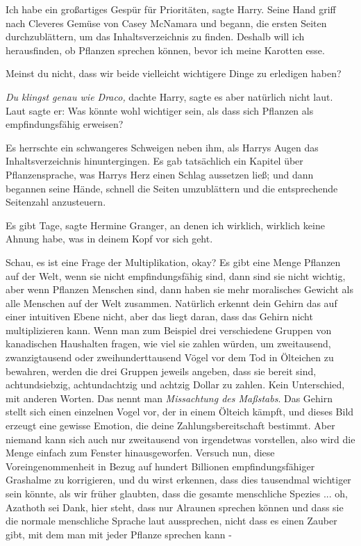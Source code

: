 \glqq{}Ich habe ein großartiges Gespür für Prioritäten\grqq{}, sagte Harry. Seine
Hand griff nach \glqq{}Cleveres Gemüse\grqq{} von Casey McNamara und begann, die
ersten Seiten durchzublättern, um das Inhaltsverzeichnis zu finden. \glqq{}
Deshalb will ich herausfinden, ob Pflanzen sprechen können, bevor ich meine
Karotten esse.\grqq{}

\glqq{}Meinst du nicht, dass wir beide vielleicht wichtigere Dinge zu erledigen
haben?\grqq{}

\emph{Du klingst genau wie Draco,} dachte Harry, sagte es aber natürlich nicht
laut. Laut sagte er: \glqq{}Was könnte wohl wichtiger sein, als dass sich
Pflanzen als empfindungsfähig erweisen?\grqq{}

Es herrschte ein schwangeres Schweigen neben ihm, als Harrys Augen das
Inhaltsverzeichnis hinuntergingen. Es gab tatsächlich ein Kapitel über
Pflanzensprache, was Harrys Herz einen Schlag aussetzen ließ; und dann begannen
seine Hände, schnell die Seiten umzublättern und die entsprechende Seitenzahl
anzusteuern.

\glqq{}Es gibt Tage\grqq{}, sagte Hermine Granger, \glqq{}an denen ich wirklich,
wirklich keine Ahnung habe, was in deinem Kopf vor sich geht.\grqq{}

\glqq{}Schau, es ist eine Frage der Multiplikation, okay? Es gibt eine Menge
Pflanzen auf der Welt, wenn sie nicht empfindungsfähig sind, dann sind sie nicht
wichtig, aber wenn Pflanzen Menschen sind, dann haben sie mehr moralisches
Gewicht als alle Menschen auf der Welt zusammen. Natürlich erkennt dein Gehirn
das auf einer intuitiven Ebene nicht, aber das liegt daran, dass das Gehirn
nicht multiplizieren kann. Wenn man zum Beispiel drei verschiedene Gruppen von
kanadischen Haushalten fragen, wie viel sie zahlen würden, um zweitausend,
zwanzigtausend oder zweihunderttausend Vögel vor dem Tod in Ölteichen zu
bewahren, werden die drei Gruppen jeweils angeben, dass sie bereit sind,
achtundsiebzig, achtundachtzig und achtzig Dollar zu zahlen. Kein Unterschied,
mit anderen Worten. Das nennt man \glqq{}\emph{Missachtung des Maßstabs}\grqq{}.
Das Gehirn stellt sich einen einzelnen Vogel vor, der in einem Ölteich kämpft,
und dieses Bild erzeugt eine gewisse Emotion, die deine Zahlungsbereitschaft
bestimmt. Aber niemand kann sich auch nur zweitausend von irgendetwas
vorstellen, also wird die Menge einfach zum Fenster hinausgeworfen. Versuch nun,
diese Voreingenommenheit in Bezug auf hundert Billionen empfindungsfähiger
Grashalme zu korrigieren, und du wirst erkennen, dass dies tausendmal wichtiger
sein könnte, als wir früher glaubten, dass die gesamte menschliche Spezies ...
oh, Azathoth sei Dank, hier steht, dass nur Alraunen sprechen können und dass
sie die normale menschliche Sprache laut aussprechen, nicht dass es einen Zauber
gibt, mit dem man mit jeder Pflanze sprechen kann -\grqq{}

